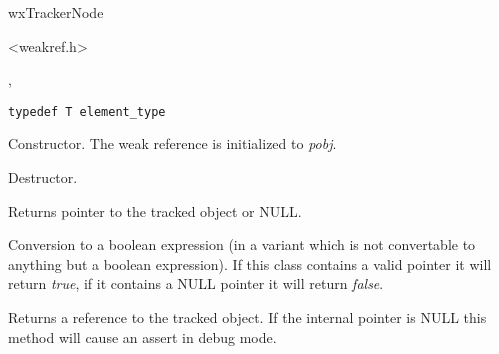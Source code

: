 
wxTrackerNode


<weakref.h>


, 


{\small%
\begin{verbatim}
typedef T element_type
\end{verbatim}
}%




\label{wxweakrefwxweakref}


Constructor. The weak reference is initialized to {\it pobj}.


\label{wxweakrefdtor}


Destructor.


\label{wxweakrefget}


Returns pointer to the tracked object or NULL.

\label{wxweakrefoperatorbool}


Conversion to a boolean expression (in a variant which is not 
convertable to anything but a boolean expression). If this class
contains a valid pointer it will return {\it true}, if it contains
a NULL pointer it will return {\it false}.


\label{wxweakrefoperatorreft}


Returns a reference to the tracked object. If the internal pointer is NULL
this method will cause an assert in debug mode.


\label{wxweakrefoperatorderef}



